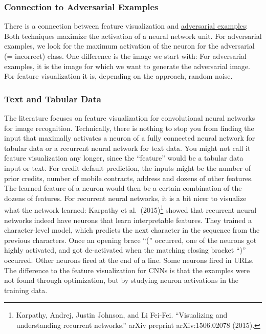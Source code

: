 \documentclass[
  10pt,
]{scrbook}
\begin{document}
\hypertarget{connection-to-adversarial-examples}{%
\subsubsection{Connection to Adversarial Examples}\label{connection-to-adversarial-examples}}

There is a connection between feature visualization and \protect\hyperlink{adversarial}{adversarial examples}:
Both techniques maximize the activation of a neural network unit.
For adversarial examples, we look for the maximum activation of the neuron for the adversarial (= incorrect) class.
One difference is the image we start with:
For adversarial examples, it is the image for which we want to generate the adversarial image.
For feature visualization it is, depending on the approach, random noise.

\hypertarget{text-and-tabular-data}{%
\subsubsection{Text and Tabular Data}\label{text-and-tabular-data}}

The literature focuses on feature visualization for convolutional neural networks for image recognition.
Technically, there is nothing to stop you from finding the input that maximally activates a neuron of a fully connected neural network for tabular data or a recurrent neural network for text data.
You might not call it feature visualization any longer, since the ``feature'' would be a tabular data input or text.
For credit default prediction, the inputs might be the number of prior credits, number of mobile contracts, address and dozens of other features.
The learned feature of a neuron would then be a certain combination of the dozens of features.
For recurrent neural networks, it is a bit nicer to visualize what the network learned:
Karpathy et al.~(2015)\footnote{Karpathy, Andrej, Justin Johnson, and Li Fei-Fei. ``Visualizing and understanding recurrent networks.'' arXiv preprint arXiv:1506.02078 (2015).} showed that recurrent neural networks indeed have neurons that learn interpretable features.
They trained a character-level model, which predicts the next character in the sequence from the previous characters.
Once an opening brace ``('' occurred, one of the neurons got highly activated, and got de-activated when the matching closing bracket ``)'' occurred.
Other neurons fired at the end of a line.
Some neurons fired in URLs.
The difference to the feature visualization for CNNs is that the examples were not found through optimization, but by studying neuron activations in the training data.
\end{document}
